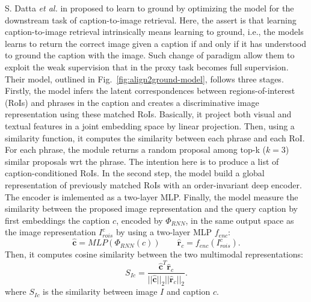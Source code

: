 S. Datta \textit{et al.} in \cite{datta2019align2ground} proposed to
learn to ground by optimizing the model for the downstream task of
caption-to-image retrieval. Here, the assert is that learning
caption-to-image retrieval intrinsically means learning to ground,
i.e., the models learns to return the correct image given a caption if
and only if it has understood to ground the caption with the image.
Such change of paradigm allow them to exploit the weak supervision
that in the proxy task becomes full supervision. Their model, outlined
in Fig.~\ref{fig:align2ground-model}, follows three stages. Firstly,
the model infers the latent correspondences between
regions-of-interest (RoIs) and phrases in the caption and creates a
discriminative image representation using these matched RoIs.
Basically, it project both visual and textual features in a joint
embedding space by linear projection. Then, using a similarity
function, it computes the similarity between each phrase and each RoI.
For each phrase, the module returns a random proposal among top-k ($k
= 3$) similar proposals wrt the phrase. The intention here is to
produce a list of caption-conditioned RoIs. In the second step, the
model build a global representation of previously matched RoIs with an
order-invariant deep encoder. The encoder is imlemented as a two-layer
MLP. Finally, the model measure the similarity between the proposed
image representation and the query caption by first embeddings the
caption $c$, encoded by $\Phi_{RNN}$, in the same output space as the
image representation $I^c_{rois}$ by using a two-layer MLP $f_{enc}$:
\begin{equation}
  \hat{\bm{c}} = MLP (\Phi_{RNN} (c)) \qquad \hat{\bm{r}}_c = f_{enc} (I^c_{rois}).
\end{equation}
Then, it computes cosine similarity between the two multimodal
representations:
\begin{equation}
  S_{Ic} = \frac{ \hat{\bm{c}}^T \hat{\bm{r}}_c }{ || \hat{\bm{c}} ||_2 || \hat{\bm{r}}_c ||_2 }.
\end{equation}
where $S_{Ic}$ is the similarity between image $I$ and caption $c$. 
